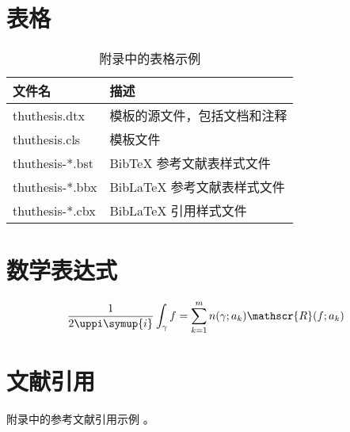 \section{表格}


\begin{table}
  \centering
  \caption{附录中的表格示例}
  \begin{tabular}{ll}
    \toprule
    文件名          & 描述                         \\
    \midrule
    thuthesis.dtx   & 模板的源文件，包括文档和注释 \\
    thuthesis.cls   & 模板文件                     \\
    thuthesis-*.bst & BibTeX 参考文献表样式文件    \\
    thuthesis-*.bbx & BibLaTeX 参考文献表样式文件  \\
    thuthesis-*.cbx & BibLaTeX 引用样式文件        \\
    \bottomrule
  \end{tabular}
  \label{tab:appendix-table}
\end{table}


\section{数学表达式}

\begin{equation}
  \frac{1}{2 \uppi \symup{i}} \int_\gamma f = \sum_{k=1}^m n(\gamma; a_k) \mathscr{R}(f; a_k)
  \label{eq:appendix-equation}
\end{equation}


\section{文献引用}

附录\cite{dupont1974bone}中的参考文献引用\cite{zhengkaiqing1987}示例
\cite{dupont1974bone,zhengkaiqing1987}。

\printbibliography
